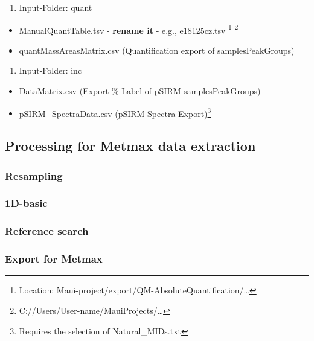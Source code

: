 \documentclass[]{book}
\providecommand{\tightlist}{%
  \setlength{\itemsep}{0pt}\setlength{\parskip}{0pt}}
\let\rmarkdownfootnote\footnote%
\def\footnote{\protect\rmarkdownfootnote}
\theoremstyle{definition}
\theoremstyle{definition}
\theoremstyle{definition}
\theoremstyle{remark}
\begin{document}
\begin{enumerate}
\def\labelenumi{\arabic{enumi}.}
\setcounter{enumi}{1}
\tightlist
\item
  Input-Folder: quant
\end{enumerate}

\begin{itemize}
\tightlist
\item
  ManualQuantTable.tsv - \textbf{rename it} - e.g., e18125cz.tsv
  \footnote{Location:
    Maui-project/export/QM-AbsoluteQuantification/\ldots{}} \footnote{C://Users/User-name/MauiProjects/\ldots{}}
\item
  quantMassAreasMatrix.csv (Quantification export of samplesPeakGroups)
\end{itemize}

\begin{enumerate}
\def\labelenumi{\arabic{enumi}.}
\setcounter{enumi}{2}
\tightlist
\item
  Input-Folder: inc
\end{enumerate}

\begin{itemize}
\tightlist
\item
  DataMatrix.csv (Export \% Label of pSIRM-samplesPeakGroups)
\item
  pSIRM\_SpectraData.csv (pSIRM Spectra Export)\footnote{Requires the
    selection of Natural\_MIDs.txt}
\end{itemize}

\subsection{Processing for Metmax data
extraction}\label{processing-for-metmax-data-extraction}

\subsubsection{Resampling}\label{resampling-1}

\subsubsection{1D-basic}\label{d-basic}

\subsubsection{Reference search}\label{reference-search}

\subsubsection{Export for Metmax}\label{export-for-metmax}
\end{document}
